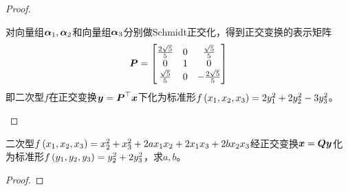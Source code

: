 \begin{proof}
\begin{enumerate}
{              对向量组\(\boldsymbol{\alpha}_1,\boldsymbol{\alpha}_2\)和向量组\(\boldsymbol{\alpha}_3\)分别做Schmidt正交化，得到正交变换的表示矩阵
              \begin{equation*}
                  \boldsymbol{P}=
                  \begin{bmatrix}
                      \frac{2\sqrt{5}}{5} & 0 & \frac{\sqrt{5}}{5}   \\
                      0                   & 1 & 0                    \\
                      \frac{\sqrt{5}}{5}  & 0 & -\frac{2\sqrt{5}}{5}
                  \end{bmatrix}
              \end{equation*}
              即二次型\(f\)在正交变换\(\boldsymbol{y}=\boldsymbol{P}^\top\boldsymbol{x}\)下化为标准形\(f\left( x_1,x_2,x_3 \right)=2y_1^2+2y_2^2-3y_3^2\)。
              }
    \end{enumerate}
\end{proof}

\begin{problem}
二次型\(f\left( x_1,x_2,x_3 \right)=x_2^2+x_3^2+2ax_1x_2+2x_1x_3+2bx_2x_3\)经正交变换\(\boldsymbol{x}=\boldsymbol{Q}\boldsymbol{y}\)化为标准形\(f\left( y_1,y_2,y_3 \right)=y_2^2+2y_3^2\)，求\(a,b\)。
\end{problem}
\begin{proof}
\end{proof}

